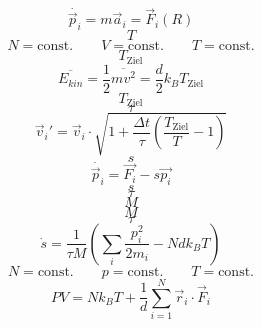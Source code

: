 \documentclass{scrreprt}
\begin{document}
\begin{equation}
  \dot{\vec p_i} = m \vec a_i = \vec F_i(R)
\end{equation}
\begin{equation}
T
\end{equation}
\begin{equation}
  N = \text{const.}
  \qquad
  V = \text{const.}
  \qquad
  T = \text{const.}
\end{equation}
\begin{equation}
T_\text{Ziel}
\end{equation}
\begin{equation}
  \overline{E_{kin}} = \frac{1}{2} \overline{m v^2} = \frac{d}{2} k_B T_\text{Ziel}
\end{equation}
\begin{equation}
T_\text{Ziel}
\end{equation}
\begin{equation}
\tau
\end{equation}
\begin{equation}
  \vec v_i' = \vec v_i \cdot \sqrt{1 + \frac{\Delta t}{\tau} \left(\frac{T_\text{Ziel}}{T} - 1\right)}
\end{equation}
\begin{equation}
s
\end{equation}
\begin{equation}
  \dot{\vec p_i} = \vec{F_i} - s \vec{p_i}
\end{equation}
\begin{equation}
s
\end{equation}
\begin{equation}
\tau
\end{equation}
\begin{equation}
M
\end{equation}
\begin{equation}
M
\end{equation}
\begin{equation}
\tau
\end{equation}
\begin{equation}
  \dot s = \frac{1}{\tau M} \left(\sum_i{\frac{p_i^2}{2m_i}} - N d k_B T\right)
\end{equation}
\begin{equation}
  N = \text{const.}
  \qquad
  p = \text{const.}
  \qquad
  T = \text{const.}
\end{equation}
\begin{equation}
  P V = N k_B T + \frac{1}{d} \sum_{i=1}^N{\vec{r}_i \cdot \vec{F}_i}
\end{equation}
\end{document}
